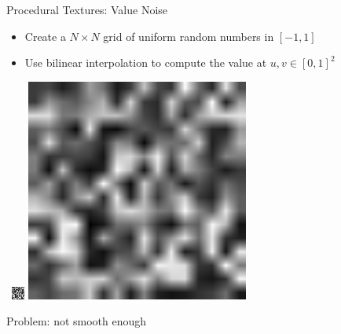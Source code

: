\documentclass[utf8,stillsansserifmath,fleqn,t]{beamer}
\begin{document}
\begin{frame}
\frametitle{\insertsection}
Procedural Textures: Value Noise
\begin{itemize}
\item Create a $N\times N$ grid of uniform random numbers in $[-1,1]$
\item Use bilinear interpolation to compute the value at $u,v\in [0,1]^2$
\end{itemize}
~\hfill\hfill\includegraphics[width=.4\textwidth]{./fig/value-noise-raw.png}\hfill
\includegraphics[width=.4\textwidth]{./fig/value-noise-bilinear.png}\hfill\hfill~\\
\centerline{Problem: not smooth enough}
\end{frame}
\end{document}
